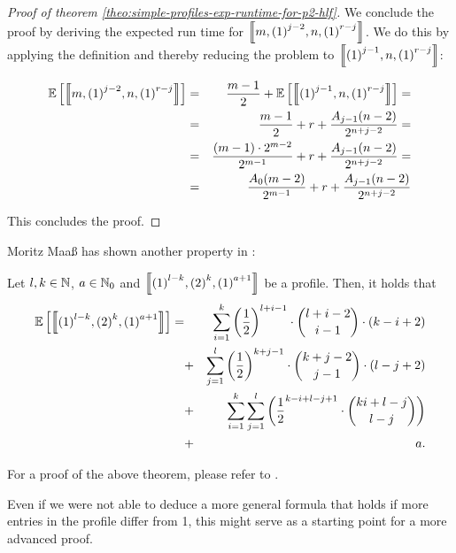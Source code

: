 \begin{proof}[Proof of theorem \ref{theo:simple-profiles-exp-runtime-for-p2-hlf}]
  We conclude the proof by deriving the expected run time for $\left\llbracket m,{(1)}^{j-2},n,{(1)}^{r-j} \right\rrbracket$. We do this by applying the definition and thereby reducing the problem to $\left\llbracket {(1)}^{j-1},n,{(1)}^{r-j} \right\rrbracket$:

  \begin{eqnarray*}
    \mathbb{E}\left[ \left\llbracket m,{(1)}^{j-2},n,{(1)}^{r-j} \right\rrbracket \right]
    & = & 
    \frac{m-1}{2} + \mathbb{E}\left[ \left\llbracket {(1)}^{j-1},n,{(1)}^{r-j} \right\rrbracket \right] = \\
    & = &
    \frac{m-1}{2} + r + \frac{A_{j-1}(n-2)}{2^{n+j-2}} = \\
    & = &
    \frac{(m-1)\cdot 2^{m-2}}{2^{m-1}} + r + \frac{A_{j-1}(n-2)}{2^{n+j-2}} = \\
    & = &
    \frac{A_0(m-2)}{2^{m-1}} + r + \frac{A_{j-1}(n-2)}{2^{n+j-2}}
  \end{eqnarray*}
  
  This concludes the proof.
\end{proof}

Moritz Maaß has shown another property in \cite{MoritzMaasDiploma}:

\begin{theorem}
  Let $l, k\in\mathbb{N}$, $a\in\mathbb{N}_0$ and $\left\llbracket {(1)}^{l-k}, {(2)}^{k}, {(1)}^{a+1} \right\rrbracket$ be a profile. Then, it holds that
  \begin{eqnarray*}
    \mathbb{E}\left[ \left\llbracket {(1)}^{l-k}, {(2)}^{k}, {(1)}^{a+1} \right\rrbracket \right]
    = & &
    \sum_{i=1}^k \left(\frac{1}{2}\right)^{l+i-1} \cdot \binom{l+i-2}{i-1} \cdot \left( k-i+2 \right) \\
    & + & \sum_{j=1}^l \left(\frac{1}{2}\right)^{k+j-1} \cdot \binom{k+j-2}{j-1} \cdot \left( l-j+2 \right) \\
    & + & \sum_{i=1}^k \sum_{j=1}^l \left( \frac{1}{2}^{k-i+l-j+1}\cdot\binom{ki+l-j}{l-j} \right) \\
    & + & a
    .
  \end{eqnarray*}
\end{theorem}

For a proof of the above theorem, please refer to \cite{MoritzMaasDiploma}.

Even if we were not able to deduce a more general formula that holds if more entries in the profile differ from 1, this might serve as a starting point for a more advanced proof.

